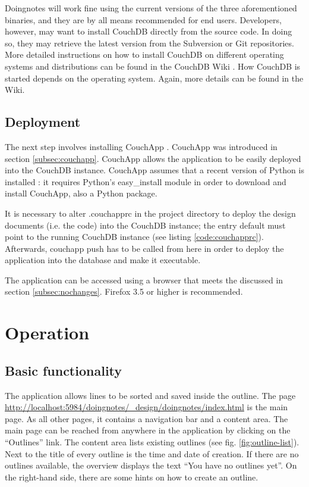Doingnotes will work fine using the current versions of the three aforementioned binaries, and they are by all means recommended for end users. Developers, however, may want to install CouchDB directly from the source code. In doing so, they may retrieve the latest version from the Subversion \cite{couch:svn} or Git \cite{couch:github} repositories. More detailed instructions on how to install CouchDB on different operating systems and distributions can be found in the CouchDB Wiki \cite{couch:installation}. How CouchDB is started depends on the operating system. Again, more details can be found in the Wiki.

\subsection{Deployment}
\label{subsec:deployment}

The next step involves installing CouchApp \cite{couch:couchapp}. CouchApp was introduced in section \ref{subsec:couchapp}. CouchApp allows the application to be easily deployed into the CouchDB instance. CouchApp assumes that a recent version of Python is installed \cite{python:homepage}: it requires Python's {\selectfont easy\_install} module \cite{python:easy} in order to download and install CouchApp, also a Python package.

It is necessary to alter {\selectfont .couchapprc} in the project directory to deploy the design documents (i.e. the code) into the CouchDB instance; the entry {\selectfont default} must point to the running CouchDB instance (see listing \ref{code:couchapprc}). Afterwards, {\selectfont couchapp push} has to be called from here in order to deploy the application into the database and make it executable.

The application can be accessed using a browser that meets the discussed in section \ref{subsec:nochanges}. Firefox \cite{firefox} 3.5 or higher is recommended.


\section{Operation}
\label{sec:bedienung}

\subsection{Basic functionality}

The application allows lines to be sorted and saved inside the outline. The page {\url{http://localhost:5984/doingnotes/\_design/doingnotes/index.html}} is the main page. As all other pages, it contains a navigation bar and a content area. The main page can be reached from anywhere in the application by clicking on the \enquote{Outlines} link. The content area lists existing outlines (see fig. \ref{fig:outline-list}). Next to the title of every outline is the time and date of creation. If there are no outlines available, the overview displays the text \enquote{You have no outlines yet}. On the right-hand side, there are some hints on how to create an outline.

